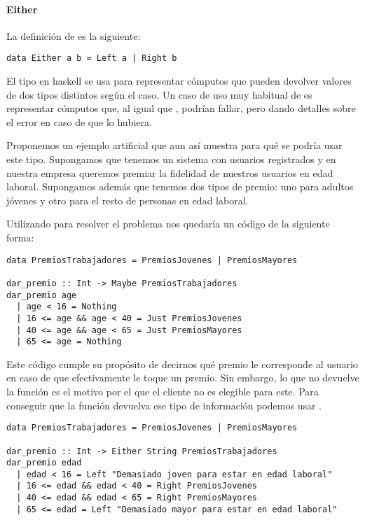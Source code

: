 \paragraph{Either}
La definición de  es la siguiente:

\begin{verbatim}
data Either a b = Left a | Right b
\end{verbatim}

El tipo  en haskell se usa para representar cómputos que pueden
devolver valores de dos tipos distintos según el caso.
Un caso de uso muy habitual
de  es representar cómputos que, al igual que ,
podrían fallar, pero dando detalles sobre el error en caso de
que lo hubiera.

Proponemos un ejemplo artificial que aun así muestra para qué se
podría usar este tipo. Supongamos que tenemos un sistema con usuarios
registrados y en nuestra empresa queremos premiar la fidelidad
de nuestros usuarios en edad laboral. Supongamos además que tenemos
dos tipos de premio: uno para adultos jóvenes y otro para el resto
de personas en edad laboral.

Utilizando  para resolver el problema nos quedaría un código
de la siguiente forma:

\begin{verbatim}
data PremiosTrabajadores = PremiosJovenes | PremiosMayores

dar_premio :: Int -> Maybe PremiosTrabajadores
dar_premio age
  | age < 16 = Nothing
  | 16 <= age && age < 40 = Just PremiosJovenes
  | 40 <= age && age < 65 = Just PremiosMayores
  | 65 <= age = Nothing
\end{verbatim}

Este código cumple su propósito de decirnos qué premio
le corresponde al usuario en caso de que efectivamente le
toque un premio. Sin embargo, lo que no devuelve la función
es el motivo por el que el cliente no es elegible para este.
Para conseguir que la función devuelva ese tipo de información
podemos usar .

\begin{verbatim}
data PremiosTrabajadores = PremiosJovenes | PremiosMayores

dar_premio :: Int -> Either String PremiosTrabajadores
dar_premio edad
  | edad < 16 = Left "Demasiado joven para estar en edad laboral"
  | 16 <= edad && edad < 40 = Right PremiosJovenes
  | 40 <= edad && edad < 65 = Right PremiosMayores
  | 65 <= edad = Left "Demasiado mayor para estar en edad laboral"
\end{verbatim}

